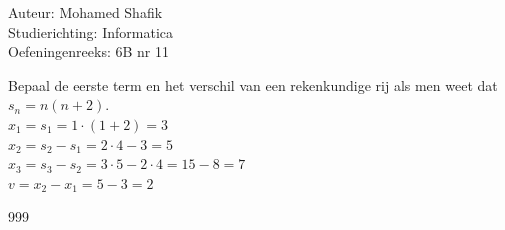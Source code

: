 \documentclass[a4paper]{article}
\begin{document}
\noindent \large Auteur: Mohamed Shafik \\
\noindent \large Studierichting: Informatica\\
\noindent \large Oefeningenreeks: 6B nr 11\\

\medskip

\normalsize

Bepaal de eerste term en het verschil van een rekenkundige rij als men weet dat $s_n = n(n+2)$.\\

$x_1 = s_1 = 1 \cdot (1+2) = 3$\\

$x_2 = s_2 - s_1 = 2 \cdot 4 - 3 = 5$\\

$x_3 = s_3 - s_2 = 3 \cdot 5 - 2 \cdot 4 = 15 - 8 = 7$\\

$v = x_2 - x_1 = 5 - 3 = 2$\\

\begin{thebibliography}{999}
\end{thebibliography}
\end{document}
